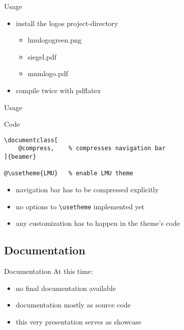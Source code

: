 \documentclass[fleqn,compress,utf8,aspectratio=169,t]{beamer}
\begin{document}
\begin{frame}{Usage}
	\begin{itemize}
		\item install the logos project-directory
		\begin{itemize}
			\item lmulogogreen.png
			\item siegel.pdf
			\item mnmlogo.pdf
		\end{itemize}
		\item compile twice with pdflatex
	\end{itemize}
\end{frame}

\begin{frame}[fragile]{Usage}
  \begin{block}{Code}
    \begin{lstlisting}[style=basetex]
\documentclass[
    @compress,    % compresses navigation bar
]{beamer}

@\usetheme{LMU}   % enable LMU theme
\end{lstlisting}
  \end{block}
  \begin{itemize}
    \item<1-> navigation bar has to be compressed explicitly
    \item<2-> no options to \lstinline$\usetheme$ implemented yet
    \item<3-> any customization has to happen in the theme's code
  \end{itemize}
\end{frame}

\subsection{Documentation}

\begin{frame}{Documentation}
  At this time:
  \begin{itemize}
    \item<1-> no final documentation available
    \item<2-> documentation mostly as source code
    \item<3-> this very presentation serves as showcase
  \end{itemize}

\end{frame}
\end{document}
